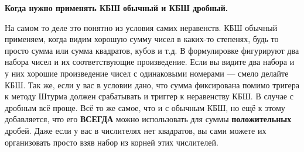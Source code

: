 \hspace{3mm}

\centerline{\bf \large Когда нужно применять КБШ обычный и КБШ дробный.}

На самом то деле это понятно из условия самих неравенств. КБШ обычный применяем, когда видим хорошую сумму чисел в каких-то степенях, будь то просто сумма или сумма квадратов, кубов и т.д. В формулировке фигурируют два набора чисел и их соответствующие произведение. Если вы видите два набора и у них хорошие произведение чисел с одинаковыми номерами --- смело делайте КБШ. Так же, если у вас в условии дано, что сумма фиксирована помимо тригера к методу Штурма должен срабатывать и триггер к неравенству КБШ. В случае с дробным всё проще. Всё то же самое, что и с обычным КБШ, но ещё к этому добавляется, что его \textbf{ВСЕГДА} можно использовать для суммы \textbf{положительных} дробей. Даже если у вас в числителях нет квадратов, вы сами можете их организовать просто взяв набор из корней этих числителей. 